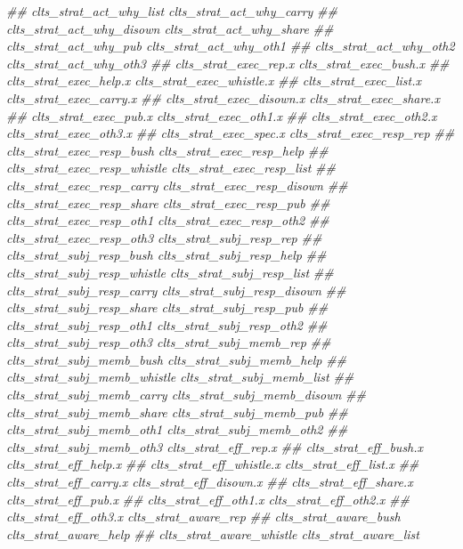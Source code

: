 \documentclass[
]{article}
\newenvironment{Shaded}{\begin{snugshade}}{\end{snugshade}}
\newcommand{\CommentTok}[1]{\textcolor[rgb]{0.56,0.35,0.01}{\textit{#1}}}
\begin{document}
\begin{Shaded}
\begin{Highlighting}[]
\CommentTok{##      clts_strat_act_why_list clts_strat_act_why_carry}
\CommentTok{##      clts_strat_act_why_disown clts_strat_act_why_share}
\CommentTok{##      clts_strat_act_why_pub clts_strat_act_why_oth1}
\CommentTok{##      clts_strat_act_why_oth2 clts_strat_act_why_oth3}
\CommentTok{##      clts_strat_exec_rep.x clts_strat_exec_bush.x}
\CommentTok{##      clts_strat_exec_help.x clts_strat_exec_whistle.x}
\CommentTok{##      clts_strat_exec_list.x clts_strat_exec_carry.x}
\CommentTok{##      clts_strat_exec_disown.x clts_strat_exec_share.x}
\CommentTok{##      clts_strat_exec_pub.x clts_strat_exec_oth1.x}
\CommentTok{##      clts_strat_exec_oth2.x clts_strat_exec_oth3.x}
\CommentTok{##      clts_strat_exec_spec.x clts_strat_exec_resp_rep}
\CommentTok{##      clts_strat_exec_resp_bush clts_strat_exec_resp_help}
\CommentTok{##      clts_strat_exec_resp_whistle clts_strat_exec_resp_list}
\CommentTok{##      clts_strat_exec_resp_carry clts_strat_exec_resp_disown}
\CommentTok{##      clts_strat_exec_resp_share clts_strat_exec_resp_pub}
\CommentTok{##      clts_strat_exec_resp_oth1 clts_strat_exec_resp_oth2}
\CommentTok{##      clts_strat_exec_resp_oth3 clts_strat_subj_resp_rep}
\CommentTok{##      clts_strat_subj_resp_bush clts_strat_subj_resp_help}
\CommentTok{##      clts_strat_subj_resp_whistle clts_strat_subj_resp_list}
\CommentTok{##      clts_strat_subj_resp_carry clts_strat_subj_resp_disown}
\CommentTok{##      clts_strat_subj_resp_share clts_strat_subj_resp_pub}
\CommentTok{##      clts_strat_subj_resp_oth1 clts_strat_subj_resp_oth2}
\CommentTok{##      clts_strat_subj_resp_oth3 clts_strat_subj_memb_rep}
\CommentTok{##      clts_strat_subj_memb_bush clts_strat_subj_memb_help}
\CommentTok{##      clts_strat_subj_memb_whistle clts_strat_subj_memb_list}
\CommentTok{##      clts_strat_subj_memb_carry clts_strat_subj_memb_disown}
\CommentTok{##      clts_strat_subj_memb_share clts_strat_subj_memb_pub}
\CommentTok{##      clts_strat_subj_memb_oth1 clts_strat_subj_memb_oth2}
\CommentTok{##      clts_strat_subj_memb_oth3 clts_strat_eff_rep.x}
\CommentTok{##      clts_strat_eff_bush.x clts_strat_eff_help.x}
\CommentTok{##      clts_strat_eff_whistle.x clts_strat_eff_list.x}
\CommentTok{##      clts_strat_eff_carry.x clts_strat_eff_disown.x}
\CommentTok{##      clts_strat_eff_share.x clts_strat_eff_pub.x}
\CommentTok{##      clts_strat_eff_oth1.x clts_strat_eff_oth2.x}
\CommentTok{##      clts_strat_eff_oth3.x clts_strat_aware_rep}
\CommentTok{##      clts_strat_aware_bush clts_strat_aware_help}
\CommentTok{##      clts_strat_aware_whistle clts_strat_aware_list}

\end{Highlighting}
\end{Shaded}
\end{document}
